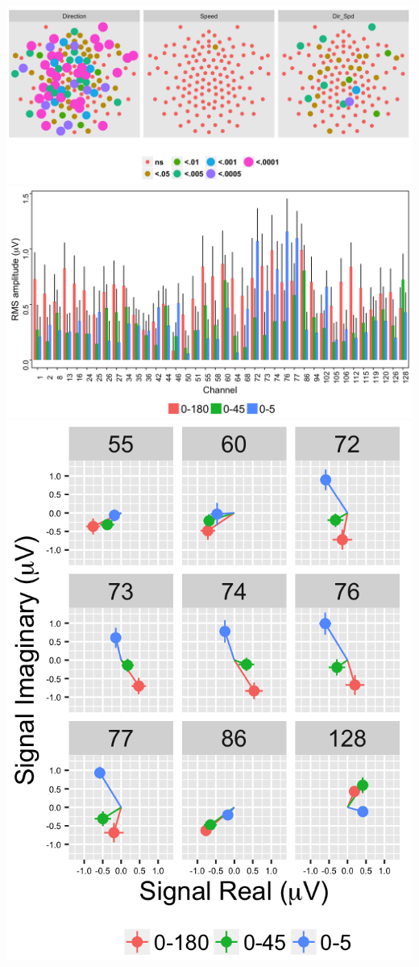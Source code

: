 \documentclass[landscape,final,paperwidth=72in,paperheight=40.5in,fontscale=0.285]{baposter}
\begin{document}
\begin{poster}
{\begin{center}

  \includegraphics[scale=0.25,valign=t]{../../figs/1F1-analyze-and-plot-main-effects-1.png}
  \hfill
  \includegraphics[scale=0.18,valign=t]{../../figs/1F1-plot-channel-effects-1.png}
  \hfill
  \includegraphics[scale=0.18,valign=t]{../../figs/1F1-plot-vector-avg-1.png}
  

\end{center}}
\end{poster}
\end{document}
